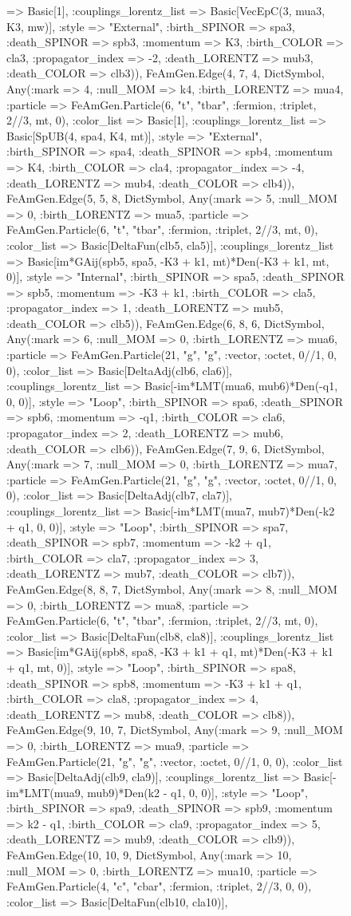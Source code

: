 \documentclass{revtex4}
\begin{document}
\begin{figure}[!htb]
\begin{center}
{=> Basic[1], :couplings_lorentz_list => Basic[VecEpC(3, mua3, K3, mw)], :style => "External", :birth_SPINOR => spa3, :death_SPINOR => spb3, :momentum => K3, :birth_COLOR => cla3, :propagator_index => -2, :death_LORENTZ => mub3, :death_COLOR => clb3)), FeAmGen.Edge(4, 7, 4, Dict{Symbol, Any}(:mark => 4, :null_MOM => k4, :birth_LORENTZ => mua4, :particle => FeAmGen.Particle(6, "t", "tbar", :fermion, :triplet, 2//3, mt, 0), :color_list => Basic[1], :couplings_lorentz_list => Basic[SpUB(4, spa4, K4, mt)], :style => "External", :birth_SPINOR => spa4, :death_SPINOR => spb4, :momentum => K4, :birth_COLOR => cla4, :propagator_index => -4, :death_LORENTZ => mub4, :death_COLOR => clb4)), FeAmGen.Edge(5, 5, 8, Dict{Symbol, Any}(:mark => 5, :null_MOM => 0, :birth_LORENTZ => mua5, :particle => FeAmGen.Particle(6, "t", "tbar", :fermion, :triplet, 2//3, mt, 0), :color_list => Basic[DeltaFun(clb5, cla5)], :couplings_lorentz_list => Basic[im*GAij(spb5, spa5, -K3 + k1, mt)*Den(-K3 + k1, mt, 0)], :style => "Internal", :birth_SPINOR => spa5, :death_SPINOR => spb5, :momentum => -K3 + k1, :birth_COLOR => cla5, :propagator_index => 1, :death_LORENTZ => mub5, :death_COLOR => clb5)), FeAmGen.Edge(6, 8, 6, Dict{Symbol, Any}(:mark => 6, :null_MOM => 0, :birth_LORENTZ => mua6, :particle => FeAmGen.Particle(21, "g", "g", :vector, :octet, 0//1, 0, 0), :color_list => Basic[DeltaAdj(clb6, cla6)], :couplings_lorentz_list => Basic[-im*LMT(mua6, mub6)*Den(-q1, 0, 0)], :style => "Loop", :birth_SPINOR => spa6, :death_SPINOR => spb6, :momentum => -q1, :birth_COLOR => cla6, :propagator_index => 2, :death_LORENTZ => mub6, :death_COLOR => clb6)), FeAmGen.Edge(7, 9, 6, Dict{Symbol, Any}(:mark => 7, :null_MOM => 0, :birth_LORENTZ => mua7, :particle => FeAmGen.Particle(21, "g", "g", :vector, :octet, 0//1, 0, 0), :color_list => Basic[DeltaAdj(clb7, cla7)], :couplings_lorentz_list => Basic[-im*LMT(mua7, mub7)*Den(-k2 + q1, 0, 0)], :style => "Loop", :birth_SPINOR => spa7, :death_SPINOR => spb7, :momentum => -k2 + q1, :birth_COLOR => cla7, :propagator_index => 3, :death_LORENTZ => mub7, :death_COLOR => clb7)), FeAmGen.Edge(8, 8, 7, Dict{Symbol, Any}(:mark => 8, :null_MOM => 0, :birth_LORENTZ => mua8, :particle => FeAmGen.Particle(6, "t", "tbar", :fermion, :triplet, 2//3, mt, 0), :color_list => Basic[DeltaFun(clb8, cla8)], :couplings_lorentz_list => Basic[im*GAij(spb8, spa8, -K3 + k1 + q1, mt)*Den(-K3 + k1 + q1, mt, 0)], :style => "Loop", :birth_SPINOR => spa8, :death_SPINOR => spb8, :momentum => -K3 + k1 + q1, :birth_COLOR => cla8, :propagator_index => 4, :death_LORENTZ => mub8, :death_COLOR => clb8)), FeAmGen.Edge(9, 10, 7, Dict{Symbol, Any}(:mark => 9, :null_MOM => 0, :birth_LORENTZ => mua9, :particle => FeAmGen.Particle(21, "g", "g", :vector, :octet, 0//1, 0, 0), :color_list => Basic[DeltaAdj(clb9, cla9)], :couplings_lorentz_list => Basic[-im*LMT(mua9, mub9)*Den(k2 - q1, 0, 0)], :style => "Loop", :birth_SPINOR => spa9, :death_SPINOR => spb9, :momentum => k2 - q1, :birth_COLOR => cla9, :propagator_index => 5, :death_LORENTZ => mub9, :death_COLOR => clb9)), FeAmGen.Edge(10, 10, 9, Dict{Symbol, Any}(:mark => 10, :null_MOM => 0, :birth_LORENTZ => mua10, :particle => FeAmGen.Particle(4, "c", "cbar", :fermion, :triplet, 2//3, 0, 0), :color_list => Basic[DeltaFun(clb10, cla10)], }
\end{center}
\end{figure}
\end{document}
